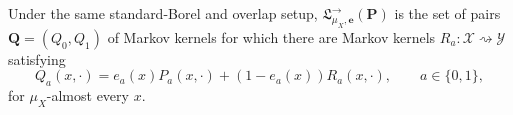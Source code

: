 Under the same standard-Borel and overlap setup, \(\mathfrak L^{\to}_{\mu_X,\boldsymbol e}(\boldsymbol P)\) is the set of pairs \(\boldsymbol Q=(Q_0,Q_1)\) of Markov kernels for which there are Markov kernels \(R_a:\mathcal X\rightsquigarrow\mathcal Y\) satisfying
\[
 Q_a(x,\cdot)=e_a(x)P_a(x,\cdot)+(1-e_a(x))R_a(x,\cdot),\qquad a\in\{0,1\},
\]
for \(\mu_X\)-almost every \(x\).